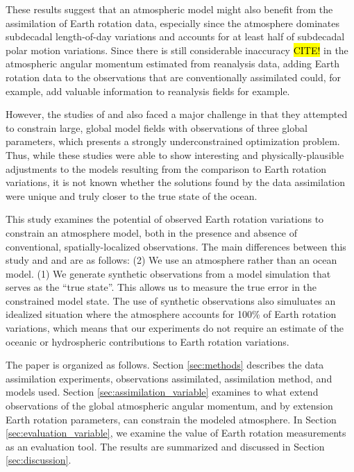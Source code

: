 These results suggest that an atmospheric model might also benefit from the assimilation of Earth rotation data, especially since the atmosphere dominates subdecadal length-of-day variations and accounts for at least half of subdecadal polar motion variations. 
Since there is still considerable inaccuracy \hl{CITE!} in the atmospheric angular momentum estimated from reanalysis data, adding Earth rotation data to the observations that are conventionally assimilated could, for example, add valuable information to reanalysis fields for example. 

However, the studies of \citet{Saynisch2010,Saynisch2011} and \citet{Saynisch2012} also faced a major challenge in that they attempted to constrain large, global model fields with observations of three global parameters, which presents a strongly underconstrained optimization problem. 
Thus, while these studies were able to show interesting and physically-plausible adjustments to the models resulting from the comparison to Earth rotation variations, it is not known whether the solutions found by the data assimilation were unique and truly closer to the true state of the ocean.  

This study examines the potential of observed Earth rotation variations to constrain an atmosphere model, both in the presence and absence of conventional, spatially-localized observations. 
The main differences between this study and \citet{Saynisch2010,Saynisch2011} and \citet{Saynisch2012} are as follows: 
(2) We use an atmosphere rather than an ocean model.
(1) We generate synthetic observations from a model simulation that serves as the ``true state''. This allows us to measure the true error in the constrained model state. The use of synthetic observations also simuluates an idealized situation where the atmosphere accounts for 100\% of Earth rotation variations, which means that our experiments do not require an estimate of the oceanic or hydrospheric contributions to Earth rotation variations.  


The paper is organized as follows.  
Section \ref{sec:methods} describes the data assimilation experiments, observations assimilated, assimilation method, and models used.
Section \ref{sec:assimilation_variable} examines to what extend observations of the global atmospheric angular momentum, and by extension Earth rotation parameters, can constrain the modeled atmosphere. 
In Section \ref{sec:evaluation_variable}, we examine the value of Earth rotation measurements as an evaluation tool.  
The results are summarized and discussed in Section \ref{sec:discussion}.

